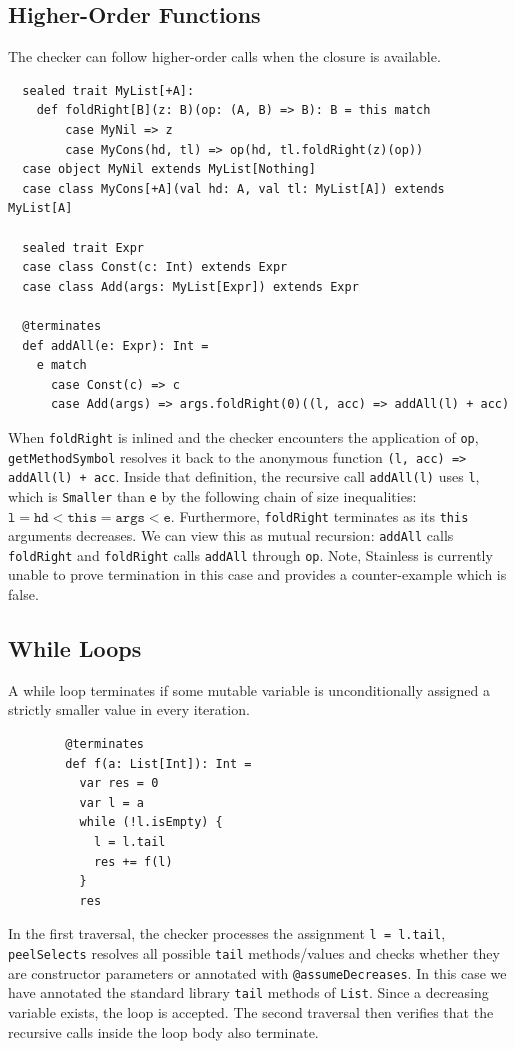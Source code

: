 \subsection{Higher-Order Functions} \label{sec:HOF}
The checker can follow higher-order calls when the closure is available.
\newpage
\begin{verbatim}
  sealed trait MyList[+A]:
    def foldRight[B](z: B)(op: (A, B) => B): B = this match
        case MyNil => z
        case MyCons(hd, tl) => op(hd, tl.foldRight(z)(op))
  case object MyNil extends MyList[Nothing]
  case class MyCons[+A](val hd: A, val tl: MyList[A]) extends MyList[A]

  sealed trait Expr
  case class Const(c: Int) extends Expr
  case class Add(args: MyList[Expr]) extends Expr

  @terminates
  def addAll(e: Expr): Int =
    e match
      case Const(c) => c
      case Add(args) => args.foldRight(0)((l, acc) => addAll(l) + acc)
\end{verbatim}
When \texttt{foldRight} is inlined and the checker encounters the application of
\texttt{op}, \texttt{getMethodSymbol} resolves it back to the anonymous
function \texttt{(l, acc) => addAll(l) + acc}. Inside that definition, the
recursive call \texttt{addAll(l)} uses \texttt{l}, which is \texttt{Smaller}
than \texttt{e} by the following chain of size inequalities:
$\texttt{l} = \texttt{hd} < \texttt{this} = \texttt{args} < \texttt{e}$.
Furthermore, \texttt{foldRight} terminates as its \texttt{this} arguments
decreases. We can view this as mutual recursion: \texttt{addAll} calls
\texttt{foldRight} and \texttt{foldRight} calls \texttt{addAll} through
\texttt{op}. Note, Stainless is currently unable to prove termination in this
case and provides a counter-example which is false.

\subsection{While Loops}
A while loop terminates if some mutable variable is unconditionally assigned a
strictly smaller value in every iteration.
\begin{verbatim}
        @terminates
        def f(a: List[Int]): Int =
          var res = 0
          var l = a
          while (!l.isEmpty) {
            l = l.tail
            res += f(l)
          }
          res
\end{verbatim}
In the first traversal, the checker processes the assignment
\texttt{l = l.tail}, \texttt{peelSelects} resolves all possible \texttt{tail}
methods/values and checks whether they are constructor parameters or annotated
with \texttt{@assumeDecreases}. In this case we have annotated the standard
library \texttt{tail} methods of \texttt{List}. Since a decreasing variable
exists, the loop is accepted. The second traversal then verifies that the
recursive calls inside the loop body also terminate.

